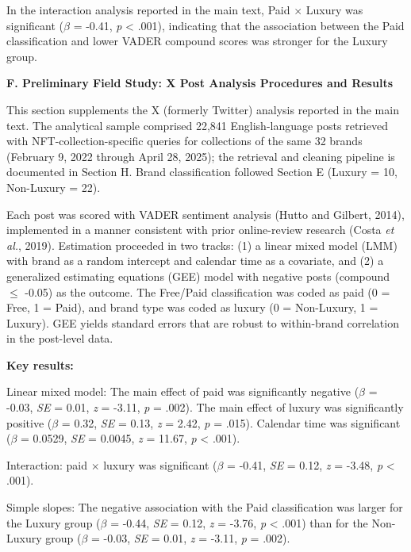 \documentclass[12pt, a4paper]{article}
\makeatletter
\newcommand{\SIAnchorHeading}[2]{\clearpage\noindent \hypertarget{#1}{{\large\bfseries #2}}\par\smallskip\@afterindentfalse\@afterheading}
\makeatother
\begin{document}
In the interaction analysis reported in the main text, Paid $\times$ Luxury was significant (\emph{$\beta$} = -0.41, \emph{p} \textless{} .001), indicating that the association between the Paid classification and lower VADER compound scores was stronger for the Luxury group.

\SIAnchorHeading{si:f}{F. Preliminary Field Study: X Post Analysis Procedures and Results}

This section supplements the X (formerly Twitter) analysis reported in the main text. The analytical sample comprised 22,841 English-language posts retrieved with NFT-collection-specific queries for collections of the same 32 brands (February 9, 2022 through April 28, 2025); the retrieval and cleaning pipeline is documented in Section H. Brand classification followed Section E (Luxury = 10, Non-Luxury = 22).

Each post was scored with VADER sentiment analysis (Hutto and Gilbert, 2014), implemented in a manner consistent with prior online-review research (Costa \emph{et al.}, 2019). Estimation proceeded in two tracks: (1) a linear mixed model (LMM) with brand as a random intercept and calendar time as a covariate, and (2) a generalized estimating equations (GEE) model with negative posts (compound $\leq$ -0.05) as the outcome. The Free/Paid classification was coded as paid (0 = Free, 1 = Paid), and brand type was coded as luxury (0 = Non-Luxury, 1 = Luxury). GEE yields standard errors that are robust to within-brand correlation in the post-level data.

\noindent \textbf{Key results:}

Linear mixed model: The main effect of paid was significantly negative (\emph{$\beta$} = -0.03, \emph{SE} = 0.01, \emph{z} = -3.11, \emph{p} = .002). The main effect of luxury was significantly positive (\emph{$\beta$} = 0.32, \emph{SE} = 0.13, \emph{z} = 2.42, \emph{p} = .015). Calendar time was significant (\emph{$\beta$} = 0.0529, \emph{SE} = 0.0045, \emph{z} = 11.67, \emph{p} \textless{} .001).

Interaction: paid $\times$ luxury was significant (\emph{$\beta$} = -0.41, \emph{SE} = 0.12, \emph{z} = -3.48, \emph{p} \textless{} .001).

Simple slopes: The negative association with the Paid classification was larger for the Luxury group (\emph{$\beta$} = -0.44, \emph{SE} = 0.12, \emph{z} = -3.76, \emph{p} \textless{} .001) than for the Non-Luxury group (\emph{$\beta$} = -0.03, \emph{SE} = 0.01, \emph{z} = -3.11, \emph{p} = .002).
\end{document}

